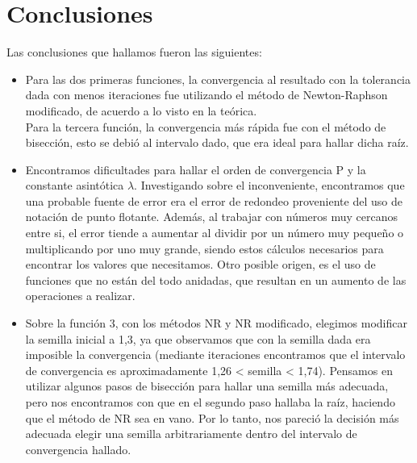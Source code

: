 \documentclass[titlepage,a4paper]{article}
\begin{document}
\section{Conclusiones}\label{sec:conclusiones}

Las conclusiones que hallamos fueron las siguientes:
\begin{itemize}
\item Para las dos primeras funciones, la convergencia al resultado con la tolerancia dada con menos iteraciones fue utilizando el método de Newton-Raphson modificado, de acuerdo a lo visto en la teórica.\\
Para la tercera función, la convergencia más rápida fue con el método de bisección, esto se debió al intervalo dado, que era ideal para hallar dicha raíz.

\item Encontramos dificultades para hallar el orden de convergencia P y la constante asintótica $\lambda$. Investigando sobre el inconveniente, encontramos que una probable fuente de error era el error de redondeo proveniente del uso de notación de punto flotante. Además, al trabajar con números muy cercanos entre si, el error tiende a aumentar al dividir por un número muy pequeño o multiplicando por uno muy grande, siendo estos cálculos necesarios para encontrar los valores que necesitamos. Otro posible origen, es el uso de funciones que no están del todo anidadas, que resultan en un aumento de las operaciones a realizar.
\item Sobre la función 3, con los métodos NR y NR modificado, elegimos modificar la semilla inicial a 1,3, ya que observamos que con la semilla dada era imposible la convergencia (mediante iteraciones encontramos que el intervalo de convergencia es aproximadamente 1,26 < semilla < 1,74). Pensamos en utilizar algunos pasos de bisección para hallar una semilla más adecuada, pero nos encontramos con que en el segundo paso hallaba la raíz, haciendo que el método de NR sea en vano. Por lo tanto, nos pareció la decisión más adecuada elegir una semilla arbitrariamente dentro del intervalo de convergencia hallado.
\end{itemize}
\end{document}
